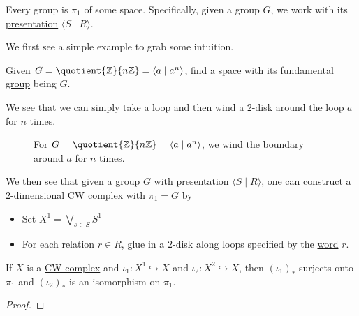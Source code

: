 \begin{remark}
	Every group is \(\pi _1\) of some space. Specifically, given a group \(G\), we work with its \hyperref[def:group-presentation]{presentation} \(\langle S\mid R \rangle \).
\end{remark}
\begin{explanation}
	We first see a simple example to grab some intuition.
	\begin{eg}
		Given \(G = \quotient{\mathbb{Z} }{n\mathbb{Z} } = \langle a\mid a^n \rangle \), find a space with its \hyperref[def:fundamental-group]{fundamental group} being \(G\).
	\end{eg}
	\begin{explanation}
		We see that we can simply take a loop and then wind a \(2\)-disk around the loop \(a\) for \(n\) times.
		\begin{figure}[H]
			\centering
			\caption{For \(G = \quotient{\mathbb{Z}}{n\mathbb{Z} } = \langle a \mid a^n \rangle \), we wind the boundary around \(a\) for \(n\) times.}
			\label{fig:lec12-eg}
		\end{figure}
	\end{explanation}
	We then see that given a group \(G\) with \hyperref[def:group-presentation]{presentation} \(\langle S \mid R \rangle \), one can construct a \(2\)-dimensional \hyperref[def:CW-Complex]{CW complex} with \(\pi _1 = G\) by
	\begin{itemize}
		\item Set \(X^1 = \bigvee_{s\in S} S^1\)
		\item For each relation \(r\in R\), glue in a \(2\)-disk along loops specified by the \hyperref[def:word]{word} \(r\).
	\end{itemize}
\end{explanation}

\begin{theorem}
	If \(X\) is a \hyperref[def:CW-Complex]{CW complex} and \(\iota _1\colon X^1\hookrightarrow X\) and \(\iota_2 \colon X^2\hookrightarrow X\), then \((\iota _1)_{\ast}\) surjects onto \(\pi _1\) and \((\iota _2)_{\ast}\) is an isomorphism on \(\pi _1\).
\end{theorem}
\begin{proof}
\end{proof}